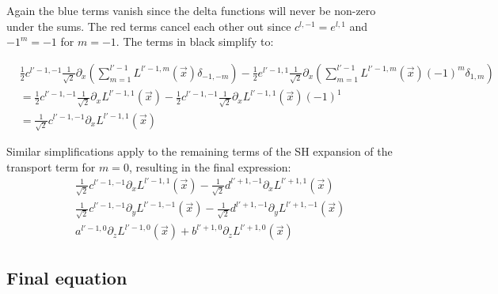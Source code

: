 Again the blue terms vanish since the delta functions will never be non-zero under the sums. The red terms cancel each other out since $c^{l,-1}=e^{l,1}$ and $-1^m=-1$ for $m=-1$. The terms in black simplify to:
\begin{small}
\begin{align*}
&
\frac{1}{2}c^{{l'-1,-1}}\frac{1}{\sqrt{2}}\partial_x\left(\sum_{m=1}^{l'-1}{L^{{l'-1,m}}\left (\vec{x} \right )\delta_{-1,-m}}\right)
-\frac{1}{2}e^{{l'-1,1}}\frac{1}{\sqrt{2}}\partial_x\left(\sum_{m=1}^{l'-1}{L^{{l'-1,m}}\left (\vec{x} \right )\left({-1}\right)^{m}\delta_{1,m}}\right)
&\\&
=
\frac{1}{2}c^{{l'-1,-1}}\frac{1}{\sqrt{2}}\partial_xL^{{l'-1,1}}\left (\vec{x} \right )
-\frac{1}{2}c^{{l'-1,-1}}\frac{1}{\sqrt{2}}\partial_xL^{{l'-1,1}}\left (\vec{x} \right )\left({-1}\right)^{1}
&\\&
=
\frac{1}{\sqrt{2}}c^{{l'-1,-1}}\partial_xL^{{l'-1,1}}\left (\vec{x} \right )
\end{align*}
\end{small}

Similar simplifications apply to the remaining terms of the SH expansion of the transport term for $m=0$, resulting in the final expression:
\begin{align*}
&
\frac{1}{\sqrt{2}}c^{{l'-1,-1}}\partial_x L^{{l'-1,1}}\left (\vec{x} \right )
-\frac{1}{\sqrt{2}}d^{{l'+1,-1}}\partial_x L^{{l'+1,1}}\left (\vec{x} \right )
\\&
\frac{1}{\sqrt{2}}c^{{l'-1,-1}}\partial_y L^{{l'-1,-1}}\left (\vec{x} \right )
-\frac{1}{\sqrt{2}}d^{{l'+1,-1}}\partial_y L^{{l'+1,-1}}\left (\vec{x} \right )
\\&
a^{{l'-1,0}}\partial_z L^{{l'-1,0}}\left (\vec{x} \right)
+b^{{l'+1,0}}\partial_z L^{{l'+1,0}}\left (\vec{x} \right)
\end{align*}

\subsection*{Final equation}

